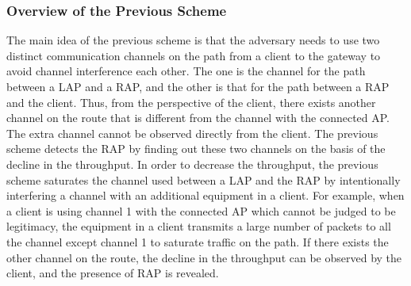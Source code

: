 \documentclass[conference]{IEEEtran}
\begin{document}
\subsubsection{Overview of the Previous Scheme}
The main idea of the previous scheme \cite{previous} is that the adversary needs to use two distinct communication channels on the path from a client to the gateway to avoid channel interference each other.
The one is the channel for the path between a LAP and a RAP, and the other is that for the path between a RAP and the client.
Thus, from the perspective of the client, there exists another channel on the route that is different from the channel with the connected AP.
The extra channel cannot be observed directly from the client.
The previous scheme detects the RAP by finding out these two channels on the basis of the decline in the throughput.
In order to decrease the throughput, the previous scheme saturates the channel used between a LAP and the RAP by intentionally interfering a channel with an additional equipment in a client.
For example, when a client is using channel 1 with the connected AP which cannot be judged to be legitimacy, the equipment in a client transmits a large number of packets to all the channel except channel 1 to saturate traffic on the path.
If there exists the other channel on the route, the decline in the throughput can be observed by the client, and the presence of RAP is revealed.
\end{document}
